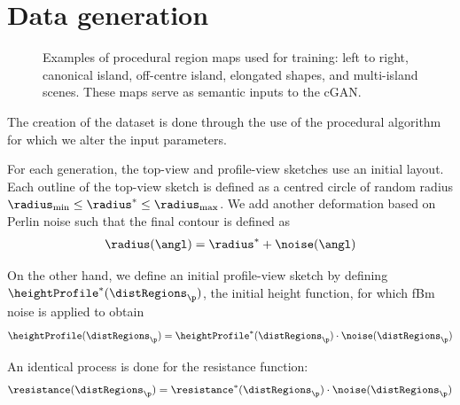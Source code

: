 \section{Data generation}
\label{sec:coral-island-dataset-generation}



\begin{figure}
    \caption{Examples of procedural region maps used for training: left to right, canonical island, off-centre island, elongated shapes, and multi-island scenes. These maps serve as semantic inputs to the cGAN.}
    \label{fig:coral-island-difficulties-dataset}
\end{figure}

The creation of the dataset is done through the use of the procedural algorithm for which we alter the input parameters.

For each generation, the top-view and profile-view sketches use an initial layout. Each outline of the top-view sketch is defined as a centred circle of random radius $\radius_\text{min} \leq \radius^* \leq \radius_\text{max}$. We add another deformation based on Perlin noise such that the final contour is defined as
\begin{align}
    \radius(\angl) = \radius^* + \noise(\angl)
\end{align}

On the other hand, we define an initial profile-view sketch by defining $\heightProfile^*(\distRegions_\p)$, the initial height function, for which fBm noise is applied to obtain
\begin{align}
    \heightProfile(\distRegions_\p) = \heightProfile^*(\distRegions_\p) \cdot \noise(\distRegions_\p)
\end{align}

An identical process is done for the resistance function:
\begin{align}
    \resistance(\distRegions_\p) = \resistance^*(\distRegions_\p) \cdot \noise(\distRegions_\p)
\end{align}

